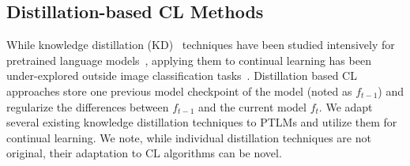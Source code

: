 \subsection{Distillation-based CL Methods}
While knowledge distillation (KD)~\cite{Hinton2015DistillingTK} techniques have been studied intensively for pretrained language models~\cite{Sun2019PatientKD}, applying them to continual learning has been under-explored outside image classification tasks~\cite{Li2018LearningWF, Rebuffi2017iCaRLIC, Hou2018LifelongLV}. Distillation based CL approaches store one previous model checkpoint of the model (noted as $f_{t-1}$) and regularize the differences between $f_{t-1}$ and the current model $f_t$.
We adapt several existing knowledge distillation techniques to PTLMs and utilize them for continual learning. We note, while individual distillation techniques are not original, their adaptation to CL algorithms can be novel.

